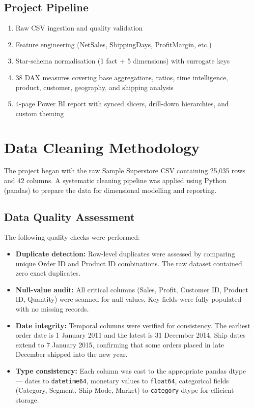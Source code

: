 \documentclass[11pt,a4paper]{article}
\begin{document}
\subsection*{Project Pipeline}
\begin{enumerate}[nosep]
    \item Raw CSV ingestion and quality validation
    \item Feature engineering (NetSales, ShippingDays, ProfitMargin, etc.)
    \item Star-schema normalisation (1 fact + 5 dimensions) with surrogate keys
    \item 38 DAX measures covering base aggregations, ratios, time intelligence, product, customer, geography, and shipping analysis
    \item 4-page Power BI report with synced slicers, drill-down hierarchies, and custom theming
\end{enumerate}

\newpage

\section{Data Cleaning Methodology}

The project began with the raw Sample Superstore CSV containing 25,035 rows and 42 columns. A systematic cleaning pipeline was applied using Python (pandas) to prepare the data for dimensional modelling and reporting.

\subsection{Data Quality Assessment}

The following quality checks were performed:

\begin{itemize}
    \item \textbf{Duplicate detection:} Row-level duplicates were assessed by comparing unique Order ID and Product ID combinations. The raw dataset contained zero exact duplicates.
    \item \textbf{Null-value audit:} All critical columns (Sales, Profit, Customer ID, Product ID, Quantity) were scanned for null values. Key fields were fully populated with no missing records.
    \item \textbf{Date integrity:} Temporal columns were verified for consistency. The earliest order date is 1 January 2011 and the latest is 31 December 2014. Ship dates extend to 7 January 2015, confirming that some orders placed in late December shipped into the new year.
    \item \textbf{Type consistency:} Each column was cast to the appropriate pandas dtype --- dates to \texttt{datetime64}, monetary values to \texttt{float64}, categorical fields (Category, Segment, Ship Mode, Market) to \texttt{category} dtype for efficient storage.
\end{itemize}
\end{document}
